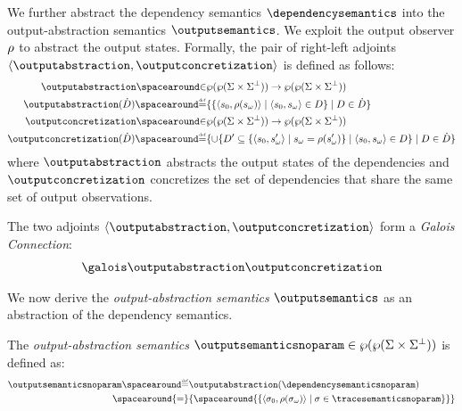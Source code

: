 We further abstract the dependency semantics $\dependencysemantics$ into the output-abstraction semantics $\outputsemantics$.
We exploit the output observer $\rho$ to abstract the output states.
Formally, the pair of right-left adjoints $\tuple{\outputabstraction}{\outputconcretization}$ is defined as follows:
%
\begin{align*}
  \outputabstraction \IN& \dependencytype \to \outputtype \\
  \outputabstraction(\defsetofsetofdependencies) \DefeQ& \setdef{
    \setdef{
      \tuple{\retrieveinput{\defstate}}{\outputobs(\retrieveoutput{\defstate})}
    }{
      \inputoutputtuple{\defstate}\in\defsetofdependencies
    }
  }{
    \defsetofdependencies \in \defsetofsetofdependencies
  }\\
  \outputconcretization \IN& \outputtype \to \dependencytype \\
  \outputconcretization(\defsetofsetofdependencies) \DefeQ& \setdef{
    \setjoin \setdef{
      \defsetofdependencies' \subseteq
      \setdef{
        \tuple{\retrieveinput\defstate}{\retrieveoutput\defstate'}
      }{
        \retrieveoutput{\defstate} = \outputobs(\retrieveoutput{\defstate'})
      }
    }{
      \inputoutputtuple{\defstate} \in \defsetofdependencies
    }
  }{
    \defsetofdependencies\in\defsetofsetofdependencies
  }
\end{align*}
where $\outputabstraction$ abstracts the output states of the dependencies and $\outputconcretization$ concretizes the set of dependencies that share the same set of output observations.

\begin{theorem}
  The two adjoints $\tuple{\outputabstraction}{\outputconcretization}$ form a \emph{Galois Connection}:
\begin{align*}
  \galoisbetweensemantics{dependency}{output}
\end{align*}
\end{theorem}

We now derive the \emph{output-abstraction semantics} $\outputsemantics$ as an abstraction of the dependency semantics.

\begin{definition}
  The \emph{output-abstraction semantics} $\outputsemanticsnoparam\in\outputtype$ is defined as:
  \begin{align*}
    \outputsemanticsnoparam\DefeQ&\outputabstraction(\dependencysemanticsnoparam) \\
    \spacearound{=}&
    \{\spacearound{
      \setdef{
        \tuple{\retrieveinput{\deftrace}}{\outputobs(\retrieveoutput{\deftrace})}
      }{
        \deftrace \in \tracesemanticsnoparam
      }
    }\}
  \end{align*}
\end{definition}

